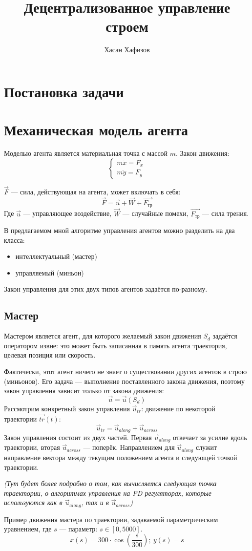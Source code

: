 \documentclass[12pt,a4paper]{article}
\author{Хасан Хафизов}
\title{Децентрализованное управление строем}
\begin{document}
	\maketitle

\section{Постановка задачи}


\section{Механическая модель агента}
Моделью агента является материальная точка с массой $m$. Закон движения:
$$\begin{cases} 
m \ddot{x} = F_x \\
m \ddot{y} = F_y \end{cases}
$$

$\vec{F}$ — сила, действующая на агента, может включать в себя:
$$ \vec{F} = \vec{u} + \vec{W} + \vec{F_{\text{тр}}}$$
Где $\vec{u}$ — управляющее воздействие, $\vec{W}$ — случайные помехи, $\vec{F_{\text{тр}}}$ — сила трения.
\par
В предлагаемом мной алгоритме управления агентов можно разделить на два класса:
\begin{itemize}
	\item интеллектуальный (мастер)
	\item управляемый (миньон)
\end{itemize}
Закон управления для этих двух типов агентов задаётся по-разному.
\subsection{Мастер}
Мастером является агент, для которого желаемый закон движения $S_d$ задаётся оператором извне: это может быть записанная в память агента траектория, целевая позиция или скорость. \par
Фактически, этот агент ничего не знает о существовании других агентов в строю (миньонов). Его задача — выполнение поставленного закона движения, поэтому закон управления зависит только от закона движения:
$$ \vec{u} = \vec{u}(S_d)$$
Рассмотрим конкретный закон управления $\vec{u}_{tr}$: движение по некоторой траектории $\vec{tr}(t)$:
$$ \vec{u}_{tr} = \vec{u}_{along} + \vec{u}_{across} $$
Закон управления состоит из двух частей. Первая $\vec{u}_{along}$ отвечает за усилие вдоль траектории, вторая $\vec{u}_{across}$ — поперёк. Направлением для $\vec{u}_{along}$ служит направление вектора между текущим положением агента и следующей точкой траектории.
\begin{center}{\textit{ (Тут будет более подробно о том, как вычисляется следующая точка траектории, о алгоритмах управления на PD регуляторах, которые используются как в $\vec{u}_{along}$, так и в $\vec{u}_{across}$)}}
\end{center}
Пример движения мастера по траектории, задаваемой параметрическим уравнением, где $s$ — параметр: $s \in [0, 5000]$.
$$x(s) = 300 \cdot \cos(\frac{s}{300}); \ y(s) = s$$
\end{document}
